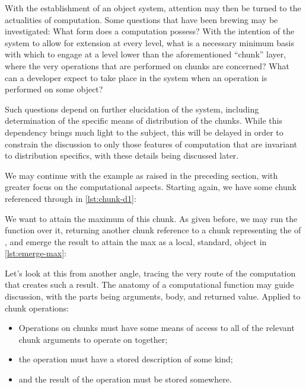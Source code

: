 With the establishment of an object system, attention may then be turned to the actualities of computation.
Some questions that have been brewing may be investigated: What form does a computation possess?
With the intention of the system to allow for extension at every level, what is a necessary minimum basis with which to engage at a level lower than the aforementioned ``chunk'' layer, where the very operations that are performed on chunks are concerned?
What can a developer expect to take place in the system when an operation is performed on some object?

Such questions depend on further elucidation of the system, including determination of the specific means of distribution of the chunks.
While this dependency brings much light to the subject, this will be delayed in order to constrain the discussion to only those features of computation that are invariant to distribution specifics, with these details being discussed later.

We may continue with the  example as raised in the preceding section, with greater focus on the computational aspects.
Starting again, we have some chunk referenced through  in \cref{lst:chunk-d1}:


We want to attain the maximum of this chunk.
As given before, we may run the  function over it, returning another chunk reference to a chunk representing the  of , and emerge the result to attain the max as a local, standard, object in \cref{lst:emerge-max}:


Let's look at this from another angle, tracing the very route of the computation that creates such a result.
The anatomy of a computational function may guide discussion, with the parts being arguments, body, and returned value.
Applied to chunk operations:

\begin{itemize} \item Operations on chunks must have some means of access to all of the relevant chunk arguments to operate on together; \item the operation must have a stored description of some kind; \item and the result of the operation must be stored somewhere.
\end{itemize}

